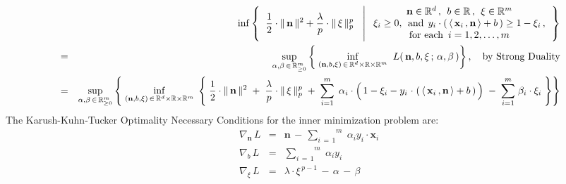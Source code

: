 \begin{eqnarray*}
&&
	\inf
	\left\{\;\;
		\dfrac{1}{2}\cdot\Vert\,\mathbf{n}\,\Vert^{2} + \dfrac{\lambda}{p}\cdot\Vert\,\xi\,\Vert_{p}^{p}
		\;\;\,\left\vert\;
		\begin{array}{c}
			\mathbf{n} \in \Re^{d} \,,\;\, b \in \Re \,,\;\, \xi \in \Re^{m}
			\\
			\xi_{i} \geq 0,\;\,\textnormal{and}\;\, y_{i}\cdot\left(\,\langle\,\mathbf{x}_{i}\,,\mathbf{n}\,\rangle + b\,\right) \geq 1 - \xi_{i}\,,
			\\
			\textnormal{for each \,$i = 1,2,\ldots,m$}
			\end{array}
			\right.
		\right\}
\\
& = &
	\underset{\alpha,\beta\,\in\,\Re_{\geq 0}^{m}}{\sup}
	\left\{\;
		\underset{(\mathbf{n},b,\xi)\,\in\,\Re^{d}\times\Re\times\Re^{m}}{\inf}\;\;
		L(\,\mathbf{n},b,\xi\,;\,\alpha,\beta\,)
		\right\},
	\quad
	\textnormal{by Strong Duality}
\\
& = &
	\underset{\alpha,\beta\,\in\,\Re_{\geq 0}^{m}}{\sup}
	\left\{\;
		\underset{(\mathbf{n},b,\xi)\,\in\,\Re^{d}\times\Re\times\Re^{m}}{\inf}\;
		\left\{\;
			\dfrac{1}{2}\cdot\Vert\,\mathbf{n}\,\Vert^{2}
			\; + \;
			\dfrac{\lambda}{p}\cdot\Vert\,\xi\,\Vert_{p}^{p}
			\; + \;
			\overset{m}{\underset{i = 1}{\sum}}\;\,
				\alpha_{i}
				\cdot
				\left(\,
					1 - \xi_{i}
					-
					y_{i}\overset{{\color{white}1}}{\cdot}\left(\,
						\langle\,\mathbf{x}_{i}\,,\mathbf{n}\,\rangle + b
						\,\right)
					\,\right)
			\; - \;
			\overset{m}{\underset{i = 1}{\sum}}\;
				\beta_{i}
				\cdot
				\xi_{i}
			\;\right\}
		\right\}
\end{eqnarray*}
The Karush-Kuhn-Tucker Optimality Necessary Conditions for the inner minimization problem are:
\begin{eqnarray*}
\nabla_{\mathbf{n}}\,L
& = &
	\mathbf{n} \, - \, \overset{m}{\underset{i\,=\,1}{\sum}}\;\alpha_{i}y_{i}\cdot\mathbf{x}_{i}
\\
\nabla_{b}\,L
& = &
	\overset{m}{\underset{i\,=\,1}{\sum}}\;\alpha_{i}y_{i}
\\
\nabla_{\xi}\,L
& = &
	\lambda\cdot\xi^{\,p-1} \, - \, \alpha \, - \, \beta
\end{eqnarray*}



